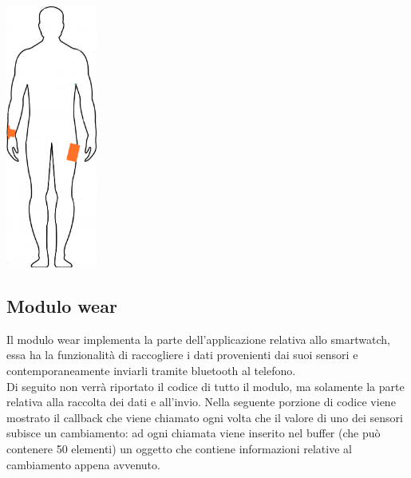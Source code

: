 \documentclass[a4paper, oneside]{book}
\begin{document}
\makebox[\linewidth]{}
\begin{minipage}{\linewidth}
\begin{center}
\includegraphics[width=30mm]{./images/sagoma_phone_watch.jpg} 
\makebox[\linewidth]{}
\end{center}
\end{minipage}
\makebox[\linewidth]{}
\makebox[\linewidth]{}


\subsection{Modulo wear}
Il modulo wear implementa la parte dell’applicazione relativa allo smartwatch, essa ha la funzionalità di raccogliere i dati provenienti dai suoi sensori e contemporaneamente inviarli tramite bluetooth al telefono.\\
Di seguito non verrà riportato il codice di tutto il modulo, ma solamente la parte relativa alla raccolta dei dati e all’invio.
Nella seguente porzione di codice viene mostrato il callback che viene chiamato ogni volta che il valore di uno dei sensori subisce un cambiamento: ad ogni chiamata viene inserito nel buffer (che può contenere 50 elementi) un oggetto che contiene informazioni relative al cambiamento appena avvenuto.
\makebox[\linewidth]{}
\makebox[\linewidth]{}



\end{document}
